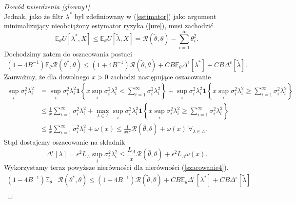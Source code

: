 \documentclass[man,mfiu]{mgrwms}
\begin{document}
\begin{proof}[Dowód twierdzenia \ref{glowny1}]
\begin{displaymath}
\end{displaymath}
Jednak, jako że filtr $\lambda^*$ był zdefiniowany w (\ref{estimator}) jako argument minimalizujący nieobciążony estymator ryzyka (\ref{ure}), musi zachodzić
\begin{displaymath}
\mathbb{E}_{\theta}U[\lambda^*,X]\leq \mathbb{E}_{\theta}U[\tilde{\lambda},X]=\mathcal{R}(\tilde{\theta},\theta)-\sum_{i=1}^{\infty}\theta_i^2.
\end{displaymath}
Dochodzimy zatem do oszacowania postaci 
\begin{equation}\label{szacowanie4}
(1-4B^{-1})\mathbb{E}_{\theta}\mathcal{R}(\theta^*,\theta)\leq (1+4B^{-1})\mathcal{R}(\tilde{\theta},\theta)+CB\mathbb{E}_{\theta}\Delta^{\epsilon}[\lambda^*]+CB\Delta^{\epsilon}[\tilde{\lambda}].
\end{equation}
Zauważmy, że dla dowolnego $x>0$ zachodzi następujące oszacowanie
\begin{displaymath}
\begin{split}
\sup_i\sigma_i^2\lambda_i^2&=\sup_i\sigma_i^2\lambda_i^2\pmb{1}\left\{x\sup_i\sigma_i^2\lambda_i^2<\sum_{i=1}^{\infty}\sigma_i^2\lambda_i^2\right\}+\sup_i\sigma_i^2\lambda_i^2\pmb{1}\left\{x\sup_i\sigma_i^2\lambda_i^2\geq \sum_{i=1}^{\infty}\sigma_i^2\lambda_i^2\right\}\\
&\leq \frac{1}{x}\sum_{i=1}^{\infty}\sigma_i^2\lambda_i^2+\max_{\lambda\in \Lambda}\sup_i\sigma_i^2\lambda_i^2\pmb{1}\left\{x\sup_i\sigma_i^2\lambda_i^2\geq \sum_{i=1}^{\infty}\sigma_i^2\lambda_i^2\right\}\\
&\leq \frac{1}{x}\sum_{i=1}^{\infty}\sigma_i^2\lambda_i^2+\omega (x)\leq \frac{1}{x\epsilon^2}\mathcal{R}(\hat{\theta},\theta)+\omega (x)\ \forall_{\lambda\in \Lambda}.
\end{split}
\end{displaymath}
Stąd dostajemy oszacowanie na składnik
\begin{displaymath}
\Delta^{\epsilon}[\lambda]=\epsilon^2 L_{\Lambda}\sup_i\sigma_i^2\lambda_i^2\leq \frac{L_{\Lambda}}{x}\mathcal{R}(\hat{\theta},\theta)+\epsilon^2L_{\Lambda}\omega (x).
\end{displaymath}
Wykorzystamy teraz powyższe nierówności dla nierówności (\ref{szacowanie4}).
\begin{displaymath}
\begin{split}
(1-4B^{-1})\mathbb{E}_{\theta}&\mathcal{R}(\theta^*,\theta)\leq (1+4B^{-1})\mathcal{R}(\tilde{\theta},\theta)+CB\mathbb{E}_{\theta}\Delta^{\epsilon}[\lambda^*]+CB\Delta^{\epsilon}[\tilde{\lambda}]\\

\end{split}
\end{displaymath}
\end{proof}
\end{document}
